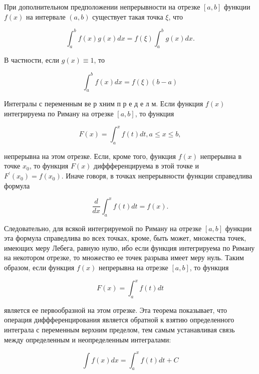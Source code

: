 \documentclass[10pt]{article}
\begin{document}
При дополнительном предположении непрерывности на отрезке $[a, b]$ функции $f(x)$ на интервале $(a, b)$ существует такая точка $\xi$, что



\[

\int_{a}^{b} f(x) g(x) d x=f(\xi) \int_{a}^{b} g(x) d x .

\]



В частности, если $g(x) \equiv 1$, то



\[

\int_{a}^{b} f(x) d x=f(\xi)(b-a)

\]



Интегралы с переменным ве р хним п р е д е л м. Если функция $f(x)$ интегрируема по Риману на отрезке $[a, b]$, то функция



\[

F(x)=\int_{a}^{x} f(t) d t, a \leqslant x \leqslant b,

\]



непрерывна на этом отрезке. Если, кроме того, функция $f(x)$ непрерывна в точке $x_{0}$, то функция $F(x)$ диффференцируема в этой точке и $F^{\prime}\left(x_{0}\right)=f\left(x_{0}\right)$. Иначе говоря, в точках непрерывности функции справедлива формула



\[

\frac{d}{d x} \int_{a}^{x} f(t) d t=f(x) .

\]



Следовательно, для всякой интегрируемой по Риману на отрезке $[a, b]$ функции эта формула справедлива во всех точках, кроме, быть может, множества точек, имеющих меру Лебега, равную нулю, ибо если функция интегрируема по Риману на некотором отрезке, то множество ее точек разрыва имеет меру нуль. Таким образом, если функция $f(x)$ непрерывна на отрезке $[a, b]$, то функция



\[

F(x)=\int_{a}^{x} f(t) d t

\]



является ее первообразной на этом отрезке. Эта теорема показывает, что операция диффференцирования является обратной к взятию определенного интеграла с переменным верхним пределом, тем самым устанавливая связь между определенным и неопределенным интегралами:



\[

\int f(x) d x=\int_{a}^{x} f(t) d t+C

\]
\end{document}

